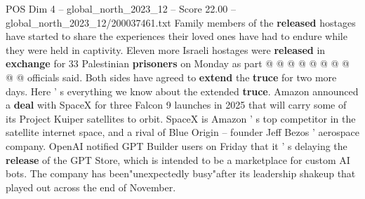 \begin{textsample}{POS Dim 4 – global\_north\_2023\_12 – Score 22.00 – global\_north\_2023\_12/200037461.txt}
Family members of the \textbf{released} hostages have started to share the experiences their loved ones have had to endure while they were held in captivity.
Eleven more Israeli hostages were \textbf{released} in \textbf{exchange} for 33 Palestinian \textbf{prisoners} on Monday as part @ @ @ @ @ @ @ @ @ @ officials said.
Both sides have agreed to \textbf{extend} the \textbf{truce} for two more days.
Here ' s everything we know about the extended \textbf{truce}.
Amazon announced a \textbf{deal} with SpaceX for three Falcon 9 launches in 2025 that will carry some of its Project Kuiper satellites to orbit.
SpaceX is Amazon ' s top competitor in the satellite internet space, and a rival of Blue Origin -- founder Jeff Bezos ' aerospace company.
OpenAI notified GPT Builder users on Friday that it ' s delaying the \textbf{release} of the GPT Store, which is intended to be a marketplace for custom AI bots.
The company has been"unexpectedly busy"after its leadership shakeup that played out across the end of November.

\end{textsample}
